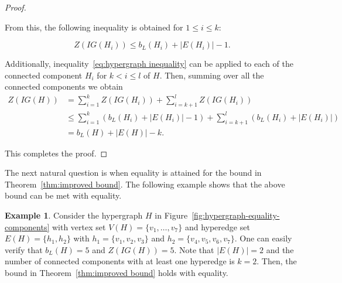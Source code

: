 \documentclass[12pt]{article}
\theoremstyle{plain}
\theoremstyle{definition}
\newtheorem{example}[theorem]{Example}
\theoremstyle{remark}
\begin{document}
\begin{proof}
\begin{description}
    From this, the following inequality is obtained for $1\leq i \leq k$:
    
    \[Z(IG(H_i)) \leq b_L(H_i) + |E(H_i)| - 1.\]
    
    Additionally, inequality~\eqref{eq:hypergraph inequality} can be applied to each of the connected component $H_i$ for $k < i \leq l$ of $H$. Then, summing over all the connected components we obtain
    \begin{align*}
        Z(IG(H)) &= \sum_{i=1}^{k} Z(IG(H_i)) + \sum_{i=k+1}^l Z(IG(H_i)) \\
        &\leq \sum_{i=1}^{k} (b_L(H_i)+|E(H_i)|-1) + \sum_{i=k+1}^l (b_L(H_i)+|E(H_i)|) \\
        &= b_L(H) + |E(H)| - k.
 \end{align*} 
\end{description}
This completes the proof.
\end{proof}

The next natural question is when equality is attained for the bound in Theorem~\ref{thm:improved bound}. The following example shows that the above bound can be met with equality.

\begin{example}
    Consider the hypergraph $H$ in Figure~\ref{fig:hypergraph-equality-components} with vertex set $V(H)=\{v_1,\dots, v_7\}$ and hyperedge set $E(H)=\{h_1,h_2\}$ with $h_1=\{v_1,v_2,v_3\}$ and $h_2=\{v_4,v_5,v_6,v_7\}$. One can easily verify that $b_L(H)=5$ and $Z(IG(H))=5$. 
    Note that $|E(H)|=2$ and the number of connected components with at least one hyperedge is $k=2$. 
    Then, the bound in Theorem~\ref{thm:improved bound} holds with equality.
    \label{example:equality-hypergraph}
\end{example}
\end{document}
